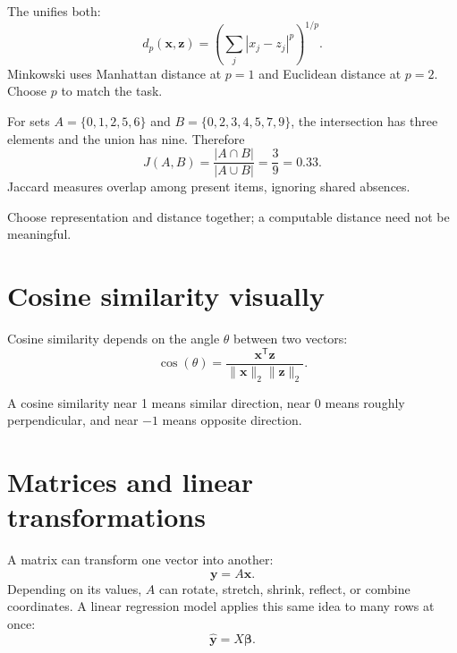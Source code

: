 The  unifies both:
\[
 d_p(\bm{x},\bm{z})=
 \left(\sum_j |x_j-z_j|^p\right)^{1/p}.
\]
Minkowski uses Manhattan distance at $p=1$ and Euclidean distance at $p=2$. Choose $p$ to match the task.

\begin{workedexample}
For sets $A=\{0,1,2,5,6\}$ and $B=\{0,2,3,4,5,7,9\}$, the intersection has three elements and the union has nine. Therefore
\[
 J(A,B)=\frac{|A\cap B|}{|A\cup B|}=\frac{3}{9}=0.33.
\]
Jaccard measures overlap among present items, ignoring shared absences.
\end{workedexample}

\begin{keyidea}
Choose representation and distance together; a computable distance need not be meaningful.
\end{keyidea}

\section{Cosine similarity visually}

Cosine similarity depends on the angle $\theta$ between two vectors:
\[
  \cos(\theta)=\frac{\bm{x}^{\mathsf T}\bm{z}}{\|\bm{x}\|_2\|\bm{z}\|_2}.
\]

\begin{mlfigure}
\end{mlfigure}

A cosine similarity near 1 means similar direction, near 0 means roughly perpendicular, and near $-1$ means opposite direction.

\section{Matrices and linear transformations}

A matrix can transform one vector into another:
\[
  \bm{y}=A\bm{x}.
\]
Depending on its values, $A$ can rotate, stretch, shrink, reflect, or combine coordinates. A linear regression model applies this same idea to many rows at once:
\[
  \hat{\bm{y}}=X\bm{\beta}.
\]

